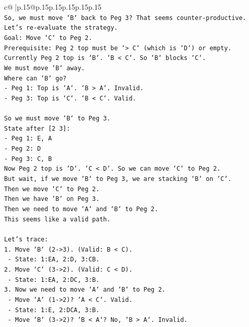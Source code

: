 \documentclass{article}
\begin{document}
{\begin{supertabular}{c@{$\;$}|p{.15\linewidth}@{}p{.15\linewidth}p{.15\linewidth}p{.15\linewidth}p{.15\linewidth}p{.15\linewidth}}
{{{\\ 
\texttt{So, we must move `B` back to Peg 3? That seems counter{-}productive.} \\
\texttt{Let's re{-}evaluate the strategy.} \\
\texttt{Goal: Move `C` to Peg 2.} \\
\texttt{Prerequisite: Peg 2 top must be `> C` (which is `D`) or empty.} \\
\texttt{Currently Peg 2 top is `B`. `B < C`. So `B` blocks `C`.} \\
\texttt{We must move `B` away.} \\
\texttt{Where can `B` go?} \\
\texttt{{-} Peg 1: Top is `A`. `B > A`. Invalid.} \\
\texttt{{-} Peg 3: Top is `C`. `B < C`. Valid.} \\
\\ 
\texttt{So we must move `B` to Peg 3.} \\
\texttt{State after {[}2 3{]}:} \\
\texttt{{-} Peg 1: E, A} \\
\texttt{{-} Peg 2: D} \\
\texttt{{-} Peg 3: C, B} \\
\texttt{Now Peg 2 top is `D`. `C < D`. So we can move `C` to Peg 2.} \\
\texttt{But wait, if we move `B` to Peg 3, we are stacking `B` on `C`.} \\
\texttt{Then we move `C` to Peg 2.} \\
\texttt{Then we have `B` on Peg 3.} \\
\texttt{Then we need to move `A` and `B` to Peg 2.} \\
\texttt{This seems like a valid path.} \\
\\ 
\texttt{Let's trace:} \\
\texttt{1. Move `B` (2{-}>3). (Valid: B < C).} \\
\texttt{   {-} State: 1:EA, 2:D, 3:CB.} \\
\texttt{2. Move `C` (3{-}>2). (Valid: C < D).} \\
\texttt{   {-} State: 1:EA, 2:DC, 3:B.} \\
\texttt{3. Now we need to move `A` and `B` to Peg 2.} \\
\texttt{   {-} Move `A` (1{-}>2)? `A < C`. Valid.} \\
\texttt{   {-} State: 1:E, 2:DCA, 3:B.} \\
\texttt{   {-} Move `B` (3{-}>2)? `B < A`? No, `B > A`. Invalid.} \\
}}}
\end{supertabular}}
\end{document}
